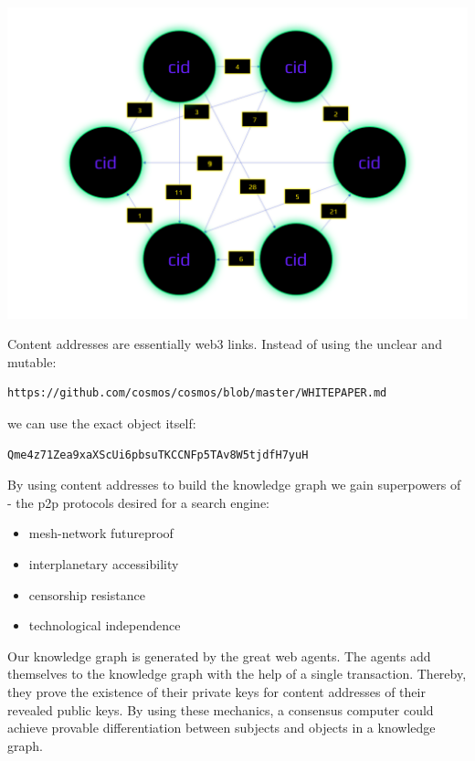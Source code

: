 \documentclass[8pt,oneside]{amsart}
\newcommand{\linkred}[2]{\href{#1}{\color{red}{#2}}}
\newcommand{\linkgreen}[2]{\href{#1}{\color{green}{#2}}}
\newenvironment{Figure}
  {\par\medskip\noindent\minipage{\linewidth}}
  {\endminipage\par\medskip}
\begin{document}
\begin{Figure}
    \centering
    \includegraphics[width=1\textwidth]{knowledge-graph.png}
\end{Figure}

Content addresses are essentially web3 links. Instead of using the unclear and mutable:
\begin{lstlisting}
https://github.com/cosmos/cosmos/blob/master/WHITEPAPER.md
\end{lstlisting}
we can use the exact object itself:
\begin{lstlisting}
Qme4z71Zea9xaXScUi6pbsuTKCCNFp5TAv8W5tjdfH7yuH
\end{lstlisting}

By using content addresses to build the knowledge graph we gain \linkred{https://steemit.com/web3/@hipster/an-idea-of-decentralized-search-for-web3-ce860d61defe5est}{the so much needed} superpowers of \linkgreen{https://ipfs.io/ipfs/QmV9tSDx9UiPeWExXEeH6aoDvmihvx6jD5eLb4jbTaKGps}{IPFS} - \linkgreen{https://ipfs.io/ipfs/QmXHGmfo4sjdHVW2MAxczAfs44RCpSeva2an4QvkzqYgfR}{like} the p2p protocols desired for a search engine:

\begin{itemize}
\item mesh-network futureproof
\item interplanetary accessibility
\item censorship resistance
\item technological independence
\end{itemize}

Our knowledge graph is generated by the great web agents. The agents add themselves to the knowledge graph with the help of a single transaction. Thereby, they prove the existence of their private keys for content addresses of their revealed public keys. By using these mechanics, a consensus computer could achieve provable differentiation between subjects and objects in a knowledge graph.
\end{document}
